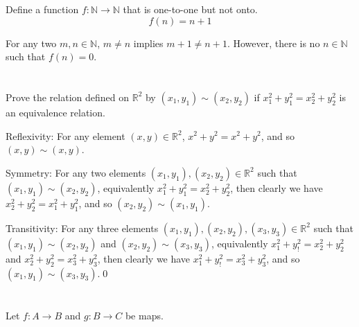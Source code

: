 Define a function $f: \mathbb{N} \rightarrow \mathbb{N}$ that is one-to-one but not onto.
\hr
\[f(n) = n + 1\]

For any two $m, n \in \mathbb{N}$, $m \neq n$ implies $m + 1 \neq n + 1$. However, there is no $n \in \mathbb{N}$ such that $f(n) = 0$.

\section{}\label{sec:21}

Prove the relation defined on $\mathbb{R}^2$ by $(x_1, y_1) \sim (x_2, y_2)$ if $x_1^2 + y_1^2 = x_2^2 + y_2^2$ is an equivalence relation.
\hr

Reflexivity: For any element $(x,y) \in \mathbb{R}^2$, $x^2 + y^2 = x^2 + y^2$, and so $(x, y) \sim (x, y)$.

\smallskip

Symmetry: For any two elements $(x_1, y_1), (x_2, y_2) \in \mathbb{R}^2$ such that $(x_1, y_1) \sim (x_2, y_2)$, equivalently
$x_1^2 + y_1^2 = x_2^2 + y_2^2$, then clearly we have $x_2^2 + y_2^2 = x_1^2 + y_1^2$, and so $(x_2, y_2) \sim (x_1, y_1)$.

\smallskip

Transitivity: For any three elements $(x_1, y_1), (x_2, y_2), (x_3, y_3) \in \mathbb{R}^2$ such that $(x_1, y_1) \sim (x_2, y_2)$ and $(x_2, y_2) \sim (x_3, y_3)$, equivalently $x_1^2 + y_!^2 = x_2^2 + y_2^2$ and $x_2^2 + y_2^2 = x_3^2 + y_3^2$, then clearly we have $x_1^2 + y_!^2 = x_3^2 + y_3^2$, and so $(x_1, y_1) \sim (x_3, y_3)$.\qed

\section{}\label{sec:22}

Let $f:A \rightarrow B$ and $g:B \rightarrow C$ be maps.

